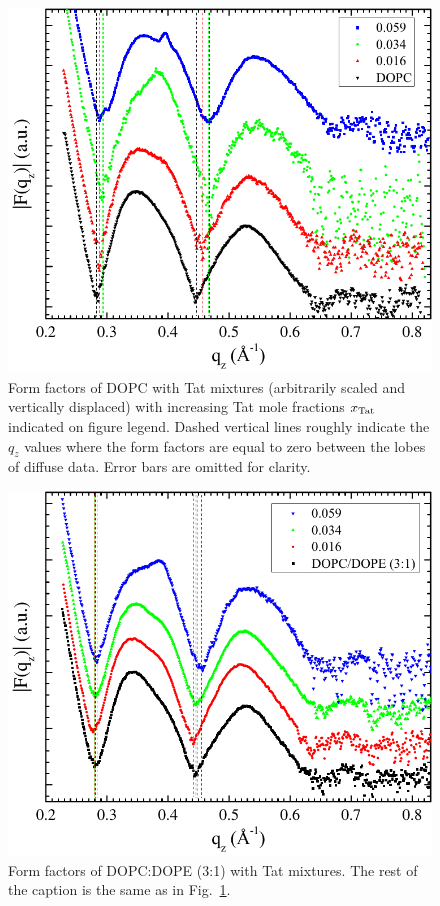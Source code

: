 \begin{figure}[htbp]
  \centering
  \includegraphics[width=\textwidth]{figures/Tat/NFIT_results/DOPC_form_factors}
  \caption[Form factors of DOPC with Tat mixtures (arbitrarily scaled and vertically 
  displaced) with increasing Tat mole fractions $\xTat$ indicated on figure 
  legend]
  {Form factors of DOPC with Tat mixtures (arbitrarily scaled and vertically 
  displaced) with increasing Tat mole fractions $\xTat$ indicated on figure 
  legend. 
  Dashed vertical lines roughly indicate the $q_z$ values where the form factors are equal 
  to zero between the lobes of diffuse data.
  Error bars are omitted for clarity.}
  \label{fig:form_factor1}
\end{figure}

\begin{figure}[htbp]
  \centering
  \includegraphics[width=\textwidth]{figures/Tat/NFIT_results/DOPCDOPE3to1_form_factors}
  \caption[Form factors of DOPC:DOPE (3:1) with Tat mixtures]
  {Form factors of DOPC:DOPE (3:1) with Tat mixtures.
  The rest of the caption is the same as in Fig.~\ref{fig:form_factor1}.}
  \label{fig:form_factor2}
\end{figure}

